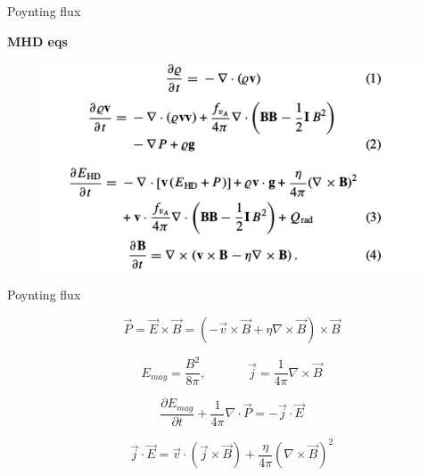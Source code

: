 \documentclass{beamer}
\begin{document}
\newcommand{\tikzAngleOfLine}{\tikz@AngleOfLine}
  \def\tikz@AngleOfLine(#1)(#2)#3{%
  \pgfmathanglebetweenpoints{%
    \pgfpointanchor{#1}{center}}{%
    \pgfpointanchor{#2}{center}}
  \pgfmathsetmacro{#3}{\pgfmathresult}%
  }



\begin{frame}{Poynting flux}

\bf{MHD eqs} 
 
\begin{figure}[H]
 \centering
 \includegraphics[scale=0.6]{eqs.png}
\end{figure}



\end{frame}

\begin{frame}{Poynting flux}

\begin{equation} \nonumber
\vec{P} =  \vec{E} \times \vec{B}   =  (- \vec{v} \times \vec{B}  + \eta \nabla \times \vec{B}) \times \vec{B}
\end{equation}

\begin{equation} \nonumber
E_{mag} = \frac{B^2}{8 \pi} , \;\;\;\; \;\;\;\; \;\;\;\;  \vec{j} = \frac{1}{4 \pi} \nabla \times \vec{B}
\end{equation}

\begin{equation} \nonumber
\frac{\partial E_{mag}}{\partial t} + \frac{1}{4 \pi} \nabla \cdot \vec{P} = -\vec{j} \cdot \vec{E}
\end{equation}



\begin{equation} \nonumber
\vec{j} \cdot \vec{E} = \vec{v} \cdot \left( \vec{j} \times \vec{B} \right) + \frac{\eta}{4 \pi} \left ( \nabla \times \vec{B} \right )^2
\end{equation}

\end{frame}
\end{document}
